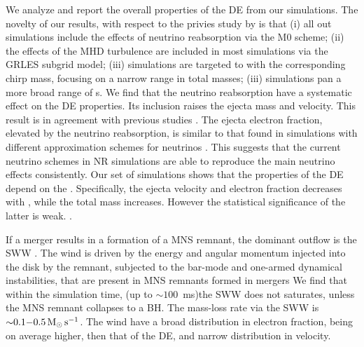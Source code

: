 We analyze and report the overall properties of the \ac{DE} from our simulations.
The novelty of our results, with respect to the privies study by \citet{Radice:2018pdn} 
is that (i) all out simulations include the effects of neutrino reabsorption via 
the M0 scheme; (ii) the effects of the \ac{MHD} turbulence are included in 
most simulations via the GRLES subgrid model; (iii) simulations are targeted to \GW{} 
with the corresponding chirp mass, focusing on a narrow range in total masses; 
(iii) simulations pan a more broad range of \mr{}s. 
We find that the neutrino reabsorption have a systematic effect on the \ac{DE} properties.
Its inclusion raises the ejecta mass and velocity.
This result is in agreement with previous studies \citep{Sekiguchi:2015dma,Radice:2018pdn}.
The ejecta electron fraction, elevated by the neutrino reabsorption, is similar to that 
found in simulations with different approximation schemes for neutrinos
\citep{Sekiguchi:2016bjd,Vincent:2019kor}. 
This suggests that the current neutrino schemes in \ac{NR} simulations are able to 
reproduce the main neutrino effects consistently.
Our set of simulations shows that the properties of the \ac{DE} depend on the \mr{}.
Specifically, the ejecta velocity and electron fraction decreases with \mr{}, while 
the total mass increases. However the statistical significance of the latter is weak.
.

If a merger results in a formation of a \ac{MNS} remnant, the dominant outflow is the 
\ac{SWW} . 
The wind is driven by the energy and angular momentum injected into the disk 
by the remnant, subjected to the bar-mode and one-armed dynamical instabilities,
that are present in \ac{MNS} remnants formed in mergers
\citep{Shibata:1999wm,Paschalidis:2015mla,Radice:2016gym}
We find that within the simulation time, (up to ${\sim}100$~ms)the \ac{SWW} does not 
saturates, unless the \ac{MNS} remnant collapses to a \ac{BH}.
The mass-loss rate via the \ac{SWW} is ${\sim}0.1{-}0.5\, {\text{M}_{\odot}}\, {\text{s}}^{-1}$.
The wind have a broad distribution in electron fraction, being on average higher,
then that of the \ac{DE}, and narrow distribution in velocity.

